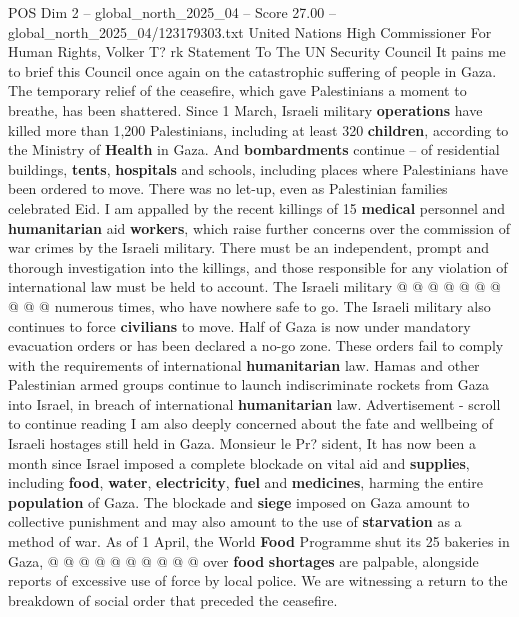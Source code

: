 \begin{textsample}{POS Dim 2 – global\_north\_2025\_04 – Score 27.00 – global\_north\_2025\_04/123179303.txt}  \label{ex:f2_pos_326}
United Nations High Commissioner For Human Rights, Volker T? rk Statement To The UN Security Council It pains me to brief this Council once again on the catastrophic suffering of people in Gaza.
The temporary relief of the ceasefire, which gave Palestinians a moment to breathe, has been shattered.
Since 1 March, Israeli military \textbf{operations} have killed more than 1,200 Palestinians, including at least 320 \textbf{children}, according to the Ministry of \textbf{Health} in Gaza.
And \textbf{bombardments} continue -- of residential buildings, \textbf{tents}, \textbf{hospitals} and schools, including places where Palestinians have been ordered to move.
There was no let-up, even as Palestinian families celebrated Eid.
I am appalled by the recent killings of 15 \textbf{medical} personnel and \textbf{humanitarian} aid \textbf{workers}, which raise further concerns over the commission of war crimes by the Israeli military.
There must be an independent, prompt and thorough investigation into the killings, and those responsible for any violation of international law must be held to account.
The Israeli military @ @ @ @ @ @ @ @ @ @ numerous times, who have nowhere safe to go.
The Israeli military also continues to force \textbf{civilians} to move.
Half of Gaza is now under mandatory evacuation orders or has been declared a no-go zone.
These orders fail to comply with the requirements of international \textbf{humanitarian} law.
Hamas and other Palestinian armed groups continue to launch indiscriminate rockets from Gaza into Israel, in breach of international \textbf{humanitarian} law.
Advertisement - scroll to continue reading I am also deeply concerned about the fate and wellbeing of Israeli hostages still held in Gaza.
Monsieur le Pr? sident, It has now been a month since Israel imposed a complete blockade on vital aid and \textbf{supplies}, including \textbf{food}, \textbf{water}, \textbf{electricity}, \textbf{fuel} and \textbf{medicines}, harming the entire \textbf{population} of Gaza.
The blockade and \textbf{siege} imposed on Gaza amount to collective punishment and may also amount to the use of \textbf{starvation} as a method of war.
As of 1 April, the World \textbf{Food} Programme shut its 25 bakeries in Gaza, @ @ @ @ @ @ @ @ @ @ over \textbf{food} \textbf{shortages} are palpable, alongside reports of excessive use of force by local police.
We are witnessing a return to the breakdown of social order that preceded the ceasefire.

\end{textsample}
